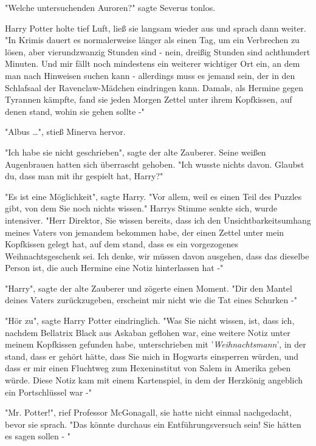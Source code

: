 {"Welche untersuchenden Auroren?" sagte Severus tonlos.

Harry Potter holte tief Luft, ließ sie langsam wieder aus und sprach dann weiter.\\ "In Krimis dauert es normalerweise länger als einen Tag, um ein Verbrechen zu lösen, aber vierundzwanzig Stunden sind - nein, dreißig Stunden sind achthundert Minuten. Und mir fällt noch mindestens ein weiterer wichtiger Ort ein, an dem man nach Hinweisen suchen kann - allerdings muss es jemand sein, der in den Schlafsaal der Ravenclaw-Mädchen eindringen kann. Damals, als Hermine gegen Tyrannen kämpfte, fand sie jeden Morgen Zettel unter ihrem Kopfkissen, auf denen stand, wohin sie gehen sollte -"

"Albus …", stieß Minerva hervor.

"Ich habe sie nicht geschrieben", sagte der alte Zauberer. Seine weißen Augenbrauen hatten sich überrascht gehoben. "Ich wusste nichts davon. Glaubst du, dass man mit ihr gespielt hat, Harry?"

"Es ist eine Möglichkeit", sagte Harry. "Vor allem, weil es einen Teil des Puzzles gibt, von dem Sie noch nichts wissen." Harrys Stimme senkte sich, wurde intensiver. "Herr Direktor, Sie wissen bereits, dass ich den Unsichtbarkeitsumhang meines Vaters von jemandem bekommen habe, der einen Zettel unter mein Kopfkissen gelegt hat, auf dem stand, dass es ein vorgezogenes Weihnachtsgeschenk sei. Ich denke, wir müssen davon ausgehen, dass das dieselbe Person ist, die auch Hermine eine Notiz hinterlassen hat -"

"Harry", sagte der alte Zauberer und zögerte einen Moment. "Dir den Mantel deines Vaters zurückzugeben, erscheint mir nicht wie die Tat eines Schurken -"

"Hör zu", sagte Harry Potter eindringlich. "Was Sie nicht wissen, ist, dass ich, nachdem Bellatrix Black aus Askaban geflohen war, eine weitere Notiz unter meinem Kopfkissen gefunden habe, unterschrieben mit '\emph{Weihnachtsmann}', in der stand, dass er gehört hätte, dass Sie mich in Hogwarts einsperren würden, und dass er mir einen Fluchtweg zum Hexeninstitut von Salem in Amerika geben würde. Diese Notiz kam mit einem Kartenspiel, in dem der Herzkönig angeblich ein Portschlüssel war -"

"Mr. Potter!", rief Professor McGonagall, sie hatte nicht einmal nachgedacht, bevor sie sprach. "Das könnte durchaus ein Entführungsversuch sein! Sie hätten es sagen sollen - "

}
